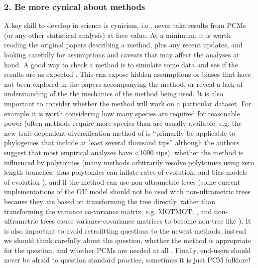 \documentclass[a4paper,12pt]{article}
\begin{document}

  \subsubsection{2. Be more cynical about methods}
    A key skill to develop in science is cynicism, i.e., never take results from PCMs (or any other statistical analysis) at face value.
    At a minimum, it is worth reading the original papers describing a method, plus any recent updates, and looking carefully for assumptions and caveats that may affect the analyses at hand.
    A good way to check a method is to simulate some data and see if the results are as expected \citep[e.g.][]{boettiger2012your}. 
    This can expose hidden assumptions or biases that have not been explored in the papers accompanying the method, or reveal a lack of understanding of the the mechanics of the method being used. 
    It is also important to consider whether the method will work on a particular dataset.
    For example it is worth considering how many species are required for reasonable power (often methods require more species than are usually available, e.g. the new trait-dependent diversification method of \citet{rabosky2015robust} is ``primarily be applicable to phylogenies that include at least several thousand tips'' although the authors suggest that most empirical analyses have \textless 1000 tips), whether the method is influenced by polytomies (many methods arbitrarily resolve polytomies using zero length branches, thus polytomies can inflate rates of evolution, and bias models of evolution \citealp{cooper2010body}), and if the method can use non-ultrametric trees (some current implementations of the OU model should not be used with non-ultrametric trees because they are based on transforming the tree directly, rather than transforming the variance co-variance matrix, e.g. MOTMOT; \citealp{Thomas:2011aa}, and non-ultrametric trees cause variance-covariance matrices to become non-tree like \citealp{slater2014correction}). 
    It is also important to avoid retrofitting questions to the newest methods, instead we should think carefully about the question, whether the method is appropriate for the question, and whether PCMs are needed at all \citep{losos2011seeing,westoby1995misinterpreting}.
    Finally, end-users should never be afraid to question standard practice, sometimes it is just PCM folklore!
\end{document}

